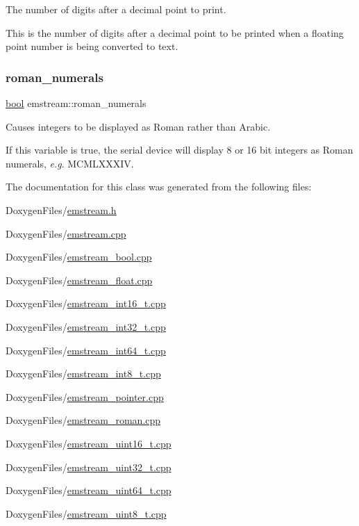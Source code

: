 The number of digits after a decimal point to print. 

This is the number of digits after a decimal point to be printed when a floating point number is being converted to text. \mbox{\label{classemstream_aaad81a99476a18142e9cc285a00de06f}} 
\subsubsection{\texorpdfstring{roman\+\_\+numerals}{roman\_numerals}}
{\footnotesize\ttfamily \mbox{\hyperlink{group___motor___boolean___type_ga0ecf26b576b9a54eca656b9be7ba6a06}{bool}} emstream\+::roman\+\_\+numerals\hspace{0.3cm}{\ttfamily [protected]}}



Causes integers to be displayed as Roman rather than Arabic. 

If this variable is true, the serial device will display 8 or 16 bit integers as Roman numerals, {\itshape e.\+g}. M\+C\+M\+L\+X\+X\+X\+IV. 

The documentation for this class was generated from the following files\+:\begin{DoxyCompactItemize}
\item 
Doxygen\+Files/\mbox{\hyperlink{emstream_8h}{emstream.\+h}}\item 
Doxygen\+Files/\mbox{\hyperlink{emstream_8cpp}{emstream.\+cpp}}\item 
Doxygen\+Files/\mbox{\hyperlink{emstream__bool_8cpp}{emstream\+\_\+bool.\+cpp}}\item 
Doxygen\+Files/\mbox{\hyperlink{emstream__float_8cpp}{emstream\+\_\+float.\+cpp}}\item 
Doxygen\+Files/\mbox{\hyperlink{emstream__int16__t_8cpp}{emstream\+\_\+int16\+\_\+t.\+cpp}}\item 
Doxygen\+Files/\mbox{\hyperlink{emstream__int32__t_8cpp}{emstream\+\_\+int32\+\_\+t.\+cpp}}\item 
Doxygen\+Files/\mbox{\hyperlink{emstream__int64__t_8cpp}{emstream\+\_\+int64\+\_\+t.\+cpp}}\item 
Doxygen\+Files/\mbox{\hyperlink{emstream__int8__t_8cpp}{emstream\+\_\+int8\+\_\+t.\+cpp}}\item 
Doxygen\+Files/\mbox{\hyperlink{emstream__pointer_8cpp}{emstream\+\_\+pointer.\+cpp}}\item 
Doxygen\+Files/\mbox{\hyperlink{emstream__roman_8cpp}{emstream\+\_\+roman.\+cpp}}\item 
Doxygen\+Files/\mbox{\hyperlink{emstream__uint16__t_8cpp}{emstream\+\_\+uint16\+\_\+t.\+cpp}}\item 
Doxygen\+Files/\mbox{\hyperlink{emstream__uint32__t_8cpp}{emstream\+\_\+uint32\+\_\+t.\+cpp}}\item 
Doxygen\+Files/\mbox{\hyperlink{emstream__uint64__t_8cpp}{emstream\+\_\+uint64\+\_\+t.\+cpp}}\item 
Doxygen\+Files/\mbox{\hyperlink{emstream__uint8__t_8cpp}{emstream\+\_\+uint8\+\_\+t.\+cpp}}\end{DoxyCompactItemize}
